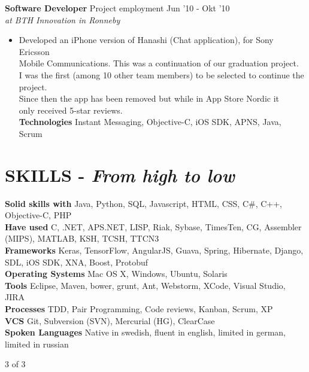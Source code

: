\documentclass[overlapped]{res}
\begin{document}
\begin{resume}
{\bf Software Developer} Project employment \hfill Jun '10 - Okt '10 \\
{\sl at BTH Innovation in Ronneby}
\begin{itemize}
\itemsep -1pt
\item Developed an iPhone version of Hanashi (Chat application), for Sony Ericsson 
\\Mobile Communications. This was a continuation of our graduation project. 
\\I was the first (among 10 other team members) to be selected to continue the project.
\\Since then the app has been removed but while in App Store Nordic it 
\\only received 5-star reviews.
\\{\bf Technologies} Instant Messaging, Objective-C, iOS SDK, APNS, Java, Scrum
\end{itemize}

\section {{\sc SKILLS} - {\sl From high to low}}
{\bf Solid skills with} Java, Python, SQL, Javascript, HTML, CSS, C\#, C++, Objective-C, PHP\\
{\bf Have used} C, .NET, APS.NET, LISP, Riak, Sybase, TimesTen, CG, Assembler (MIPS), MATLAB, KSH, TCSH, TTCN3 \\
{\bf Frameworks} Keras, TensorFlow, AngularJS, Guava, Spring, Hibernate, Django, SDL, iOS SDK, XNA, Boost, Protobuf \\
{\bf Operating Systems} Mac OS X, Windows, Ubuntu, Solaris\\
{\bf Tools} Eclipse, Maven, bower, grunt, Ant, Webstorm, XCode, Visual Studio, JIRA\\
{\bf Processes} TDD, Pair Programming, Code reviews, Kanban, Scrum, XP\\
{\bf VCS} Git, Subversion (SVN), Mercurial (HG), ClearCase\\
{\bf Spoken Languages} Native in swedish, fluent in english, limited in german, limited in russian \\

\vspace{7.6cm}
\centerline{3 of 3}
\end{resume} 
\end{document}
